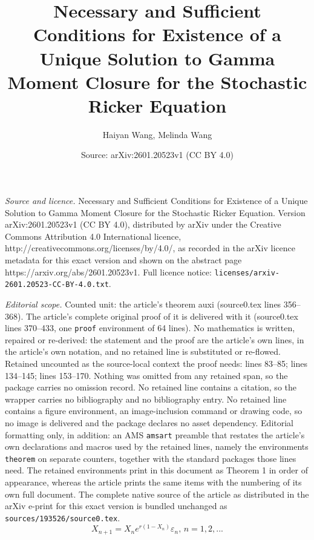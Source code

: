 \documentclass[10pt,a4paper]{amsart}
\title{Necessary and Sufficient Conditions for Existence of a Unique Solution to Gamma Moment Closure for the Stochastic Ricker Equation}
\author{Haiyan Wang, Melinda Wang}
\date{Source: arXiv:2601.20523v1 (CC BY 4.0)}
\begin{document}
\maketitle

\noindent\emph{Source and licence.} Necessary and Sufficient Conditions for Existence of a Unique Solution to Gamma Moment Closure for the Stochastic Ricker Equation. Version arXiv:2601.20523v1 (CC BY 4.0), distributed by arXiv under the Creative Commons Attribution 4.0 International licence, http://creativecommons.org/licenses/by/4.0/, as recorded in the arXiv licence metadata for this exact version and shown on the abstract page https://arxiv.org/abs/2601.20523v1. Full licence notice: \texttt{licenses/arxiv-2601.20523-CC-BY-4.0.txt}.\par\smallskip

\noindent\textit{Editorial scope.} Counted unit: the article's theorem auxi (source0.tex lines 356--368). The article's complete original proof of it is delivered with it (source0.tex lines 370--433, one \texttt{proof} environment of 64 lines). No mathematics is written, repaired or re-derived: the statement and the proof are the article's own lines, in the article's own notation, and no retained line is substituted or re-flowed.  Retained uncounted as the source-local context the proof needs: lines 83--85; lines 134--145; lines 153--170.  Nothing was omitted from any retained span, so the package carries no omission record.  No retained line contains a citation, so the wrapper carries no bibliography and no bibliography entry.  No retained line contains a figure environment, an image-inclusion command or drawing code, so no image is delivered and the package declares no asset dependency.  Editorial formatting only, in addition: an AMS \texttt{amsart} preamble that restates the article's own declarations and macros used by the retained lines, namely the environments \texttt{theorem} on separate counters, together with the standard packages those lines need.  The retained environments print in this document as Theorem 1 in order of appearance, whereas the article prints the same items with the numbering of its own full document.  The complete native source of the article as distributed in the arXiv e-print for this exact version is bundled unchanged as \texttt{sources/193526/source0.tex}.
\begin{equation}
  X_{n+1} = X_n e^{r(1 - X_n)} \varepsilon_n,\, n=1,2,... \label{eq:model}
\end{equation}
\end{document}
